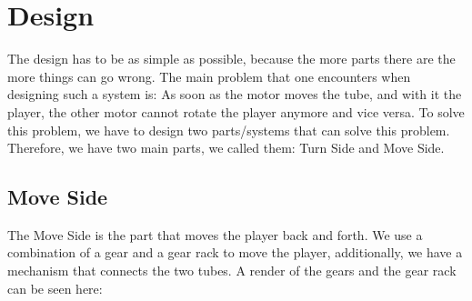 \section{Design}\label{sec:design}
The design has to be as simple as possible, because the more parts there are the more things can go wrong.
The main problem that one encounters when designing such a system is:
As soon as the motor moves the tube, and with it the player, the other motor cannot rotate the player anymore and vice versa.
To solve this problem, we have to design two parts/systems that can solve this problem.
Therefore, we have two main parts, we called them: Turn Side and Move Side.

\subsection{Move Side}\label{subsec:move-side}
The Move Side is the part that moves the player back and forth.
We use a combination of a gear and a gear rack to move the player, additionally, we have a mechanism that connects the two tubes.
A render of the gears and the gear rack can be seen here:\\

